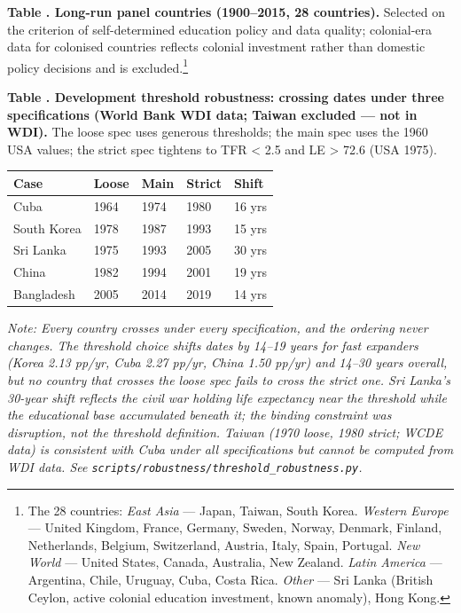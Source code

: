 \documentclass[12pt,letterpaper]{article}
\begin{document}
{\label{tab:a3}\textbf{Table \thetable. Long-run panel countries (1900--2015, 28 countries).}
Selected on the criterion of self-determined education policy and data
quality; colonial-era data for colonised countries reflects colonial
investment rather than domestic policy decisions and is excluded.\footnote{The
28 countries: \emph{East Asia} --- Japan, Taiwan, South Korea.
\emph{Western Europe} --- United Kingdom, France, Germany, Sweden,
Norway, Denmark, Finland, Netherlands, Belgium, Switzerland, Austria,
Italy, Spain, Portugal. \emph{New World} --- United States, Canada,
Australia, New Zealand. \emph{Latin America} --- Argentina, Chile,
Uruguay, Cuba, Costa Rica. \emph{Other} --- Sri Lanka (British Ceylon,
active colonial education investment, known anomaly), Hong Kong.}

\label{tab:a4}\textbf{Table \thetable. Development threshold robustness: crossing dates under
three specifications (World Bank WDI data; Taiwan excluded --- not in
WDI).} The loose spec uses generous thresholds; the main spec uses the
1960 USA values; the strict spec tightens to TFR
\textless{} 2.5 and LE \textgreater{} 72.6 (USA 1975).

\begin{longtable}[]{@{}lllll@{}}
\toprule
Case & Loose & Main & Strict & Shift \\
\midrule
\endhead
Cuba & 1964 & 1974 & 1980 & 16 yrs \\
South Korea & 1978 & 1987 & 1993 & 15 yrs \\
Sri Lanka & 1975 & 1993 & 2005 & 30 yrs \\
China & 1982 & 1994 & 2001 & 19 yrs \\
Bangladesh & 2005 & 2014 & 2019 & 14 yrs \\
\bottomrule
\end{longtable}

\emph{Note: Every country crosses under every specification, and the
ordering never changes. The threshold choice shifts dates by 14--19
years for fast expanders (Korea 2.13 pp/yr, Cuba 2.27 pp/yr, China
1.50 pp/yr) and 14--30 years overall, but no country that crosses the
loose spec fails to cross the strict one. Sri Lanka's 30-year shift
reflects the civil war holding life expectancy near the threshold while
the educational base accumulated beneath it; the binding constraint was
disruption, not the threshold definition. Taiwan (1970 loose, 1980
strict; WCDE data) is consistent with Cuba under all specifications but
cannot be computed from WDI data.
See \texttt{scripts/robustness/threshold\_robustness.py}.}

}
\end{document}
